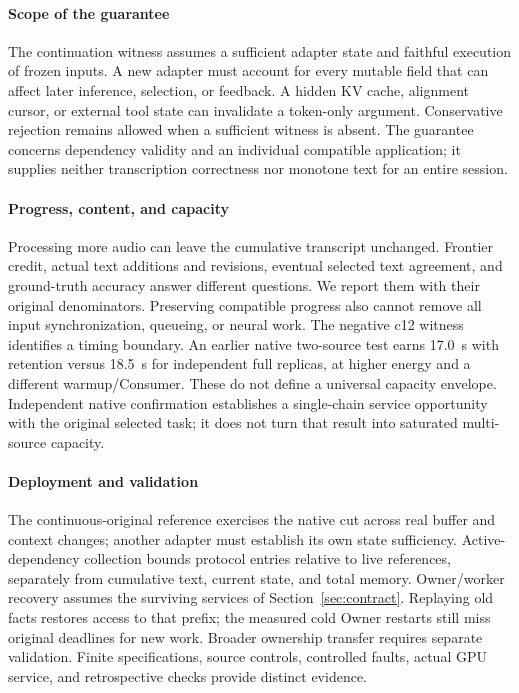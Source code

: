 \paragraph{Scope of the guarantee}
The continuation witness assumes a sufficient adapter state and faithful
execution of frozen inputs. A new adapter must account for every mutable
field that can affect later inference, selection, or feedback. A hidden
KV cache, alignment cursor, or external tool state can invalidate a
token-only argument. Conservative rejection remains allowed when a
sufficient witness is absent. The guarantee concerns dependency validity
and an individual compatible application; it supplies neither transcription
correctness nor monotone text for an entire session.

\paragraph{Progress, content, and capacity}
Processing more audio can leave the cumulative transcript unchanged.
Frontier credit, actual text additions and revisions, eventual selected
text agreement, and ground-truth accuracy answer different questions. We
report them with their original denominators. Preserving compatible
progress also cannot remove all input synchronization, queueing, or neural
work. The negative c12 witness identifies a timing boundary. An earlier
native two-source test earns 17.0~s with retention versus 18.5~s for
independent full replicas, at higher energy and a different warmup/Consumer.
These do not define a universal capacity envelope. Independent native
confirmation establishes a
single-chain service opportunity with the original selected task; it
does not turn that result into saturated multi-source capacity.

\paragraph{Deployment and validation}
The continuous-original reference exercises the native cut across real
buffer and context changes; another adapter must establish its own state
sufficiency. Active-dependency collection bounds protocol entries relative
to live references, separately from cumulative text, current state, and
total memory. Owner/worker recovery assumes the surviving services of
Section~\ref{sec:contract}. Replaying old facts restores access to that
prefix; the measured cold Owner restarts still miss original deadlines
for new work. Broader ownership transfer requires separate validation.
Finite specifications, source controls, controlled faults, actual GPU
service, and retrospective checks provide distinct evidence.


